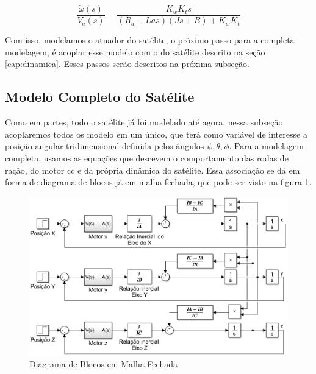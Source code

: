 \begin{equation}\label{eq:motor_accel}
  \frac{\dot{\omega}(s)}{V_a(s)} = \frac{K_wK_t s}{(R_a+ Las)(Js+B)+K_wK_t}  
\end{equation}

Com isso, modelamos o atuador do satélite, o próximo passo para a completa modelagem, é acoplar esse modelo com o do satélite descrito na seção \ref{cap:dinamica}. Esses passos serão descritos na próxima subseção.



\subsection{Modelo Completo do Satélite}

Como em partes, todo o satélite já foi modelado até agora, nessa subseção acoplaremos todos os modelo em um único, que terá como variável de interesse a posição angular tridimensional definida pelos ângulos $\psi, \theta, \phi$. Para a modelagem completa, usamos as equações que descevem o comportamento das rodas de ração, do motor cc e da própria dinâmica do satélite. Essa associação se dá em forma de diagrama de blocos já em malha fechada, que pode ser visto na figura \ref{fig:simulink_modelo_completo_aberto}.

\begin{figure}[H]
  \caption{Diagrama de Blocos em Malha Fechada}
  \begin{center}
      \includegraphics[scale=.6]{metodologia/img/simulink_modelo_completo_aberto}
  \end{center}
  \label{fig:simulink_modelo_completo_aberto}
\end{figure}

